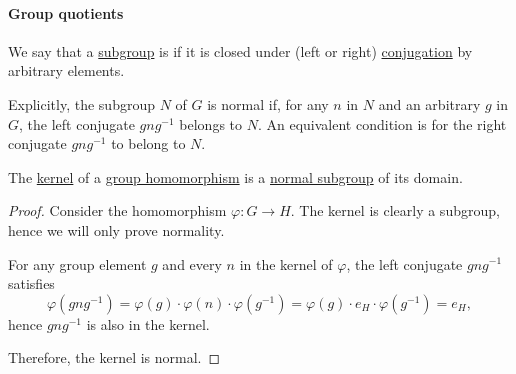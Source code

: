 \paragraph{Group quotients}

\begin{definition}\label{def:normal_subgroup}
  We say that a \hyperref[def:group/submodel]{subgroup} is  if it is closed under (left or right) \hyperref[def:group_conjugation]{conjugation} by arbitrary elements.

  Explicitly, the subgroup \( N \) of \( G \) is normal if, for any \( n \) in \( N \) and an arbitrary \( g \) in \( G \), the left conjugate \( gng^{-1} \) belongs to \( N \). An equivalent condition is for the right conjugate \( gng^{-1} \) to belong to \( N \).
\end{definition}

\begin{proposition}\label{thm:kernel_is_normal_subgroup}
  The \hyperref[def:group/kernel]{kernel} of a \hyperref[def:group/homomorphism]{group homomorphism} is a \hyperref[def:normal_subgroup]{normal subgroup} of its domain.
\end{proposition}
\begin{proof}
  Consider the homomorphism \( \varphi: G \to H \). The kernel is clearly a subgroup, hence we will only prove normality.

  For any group element \( g \) and every \( n \) in the kernel of \( \varphi \), the left conjugate \( gng^{-1} \) satisfies
  \begin{equation*}
    \varphi(gng^{-1})
    =
    \varphi(g) \cdot \varphi(n) \cdot \varphi(g^{-1})
    =
    \varphi(g) \cdot e_H \cdot \varphi(g^{-1})
    =
    e_H,
  \end{equation*}
  hence \( gng^{-1} \) is also in the kernel.

  Therefore, the kernel is normal.
\end{proof}

